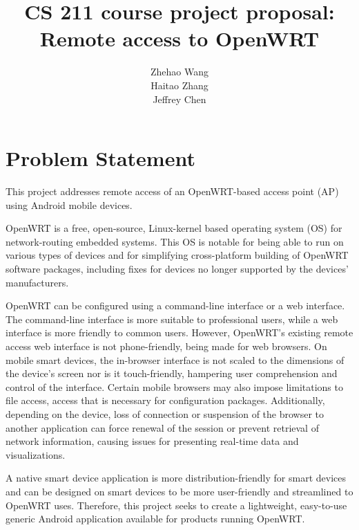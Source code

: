 \documentclass{sig-alternate-05-2015}
\begin{document}
	
	\title{CS 211 course project proposal: \\Remote access to OpenWRT}
	
	
	\author{
		\alignauthor
		Zhehao Wang \\
		\alignauthor
		Haitao Zhang \\
		\alignauthor 
		Jeffrey Chen
	}
	
	\maketitle
	
	\section{Problem Statement}
	
	This project addresses remote access of an OpenWRT-based access point (AP) using Android mobile devices.

	OpenWRT is a free, open-source, Linux-kernel based operating system (OS) for network-routing embedded systems. This OS is notable for being able to run on various types of devices and for simplifying cross-platform building of OpenWRT software packages, including fixes for devices no longer supported by the devices' manufacturers.
	
	OpenWRT can be configured using a command-line interface or a web interface. The command-line interface is more suitable to professional users, while a web interface is more friendly to common users. However, OpenWRT's existing remote access web interface is not phone-friendly, being made for web browsers. On mobile smart devices, the in-browser interface is not scaled to the dimensions of the device's screen nor is it touch-friendly, hampering user comprehension and control of the interface. Certain mobile browsers may also impose limitations to file access, access that is necessary for configuration packages. Additionally, depending on the device, loss of connection or suspension of the browser to another application can force renewal of the session or prevent retrieval of network information, causing issues for presenting real-time data and visualizations.
	
	A native smart device application is more distribution-friendly for smart devices and can be designed on smart devices to be more user-friendly and streamlined to OpenWRT uses. Therefore, this project seeks to create a lightweight, easy-to-use generic Android application available for products running OpenWRT.
	
\end{document}
